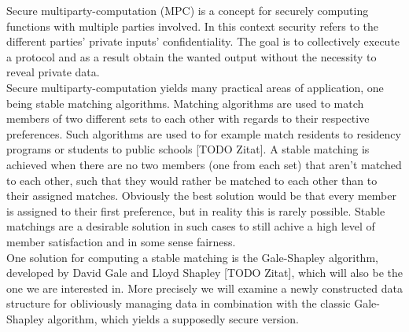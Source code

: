 Secure multiparty-computation (MPC) is a concept for securely computing functions with multiple parties involved. In this context security refers to the different parties' private inputs' confidentiality. The goal is to collectively execute a protocol and as a result obtain the wanted output without the necessity to reveal private data. \\
Secure multiparty-computation yields many practical areas of application, one being stable matching algorithms. Matching algorithms are used to match members of two different sets to each other with regards to their respective preferences. Such algorithms are used to for example match residents to residency programs or students to public schools [TODO Zitat]. A stable matching is achieved when there are no two members (one from each set) that aren't matched to each other, such that they would rather be matched to each other than to their assigned matches. Obviously the best solution would be that every member is assigned to their first preference, but in reality this is rarely possible. Stable matchings are a desirable solution in such cases to still achive a high level of member satisfaction and in some sense fairness.\\
One solution for computing a stable matching is the Gale-Shapley algorithm, developed by David Gale and Lloyd Shapley [TODO Zitat], which will also be the one we are interested in. More precisely we will examine a newly constructed data structure for obliviously managing data in combination with the classic Gale-Shapley algorithm, which yields a supposedly secure version.\\
